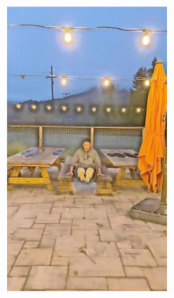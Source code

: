 \documentclass[letterpaper,12pt]{article}
\begin{document}
\begin{figure}[htbp]
\begin{subfigure}{0.128\textwidth}
			\includegraphics[width=\linewidth]{LoLi-Phone-imgT_1/LLNet}
			\captionsetup{font=scriptsize}
			\caption{}
			\label{fig: LoLi-Phone-imgT_1_b}
		\end{subfigure}
		\begin{subfigure}{0.128\textwidth}

\end{subfigure}
\end{figure}
\end{document}
